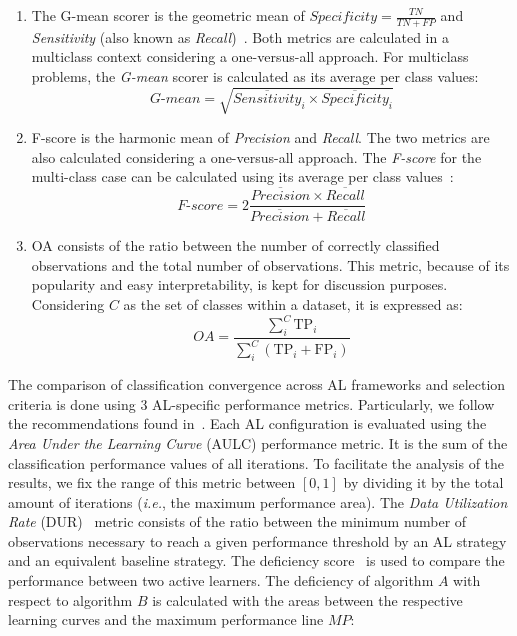 \documentclass[parskip=full]{scrartcl}
\begin{document}
\begin{enumerate}
    \item The G-mean scorer is the geometric mean of $Specificity =
        \frac{TN}{TN + FP}$ and \textit{Sensitivity} (also known as
        \textit{Recall})~\cite{Kubat1997}. Both metrics are calculated in a
        multiclass context considering a one-versus-all approach. For
        multiclass problems, the \textit{G-mean} scorer is calculated as its
        average per class values: 
        \begin{equation}\label{eq:gmean}
            \textit{G-mean} = \sqrt{\overline{Sensitivity}_i \times
            \overline{Specificity}_i}
        \end{equation}
    
    \item F-score is the harmonic mean of \textit{Precision} and
        \textit{Recall}. The two metrics are also calculated considering a
        one-versus-all approach. The \textit{F-score} for the multi-class case
        can be calculated using its average per class values~\cite{He2009}:
        \begin{equation}\label{eq:fscore}
            \textit{F-score}=2\frac{\overline{Precision} \times
            \overline{Recall}}{\overline{Precision} + \overline{Recall}}
        \end{equation}

    \item OA consists of the ratio between the number of correctly classified
        observations and the total number of observations. This metric, because
        of its popularity and easy interpretability, is kept for discussion
        purposes.  Considering $C$ as the set of classes within a dataset, it
        is expressed as: \begin{equation}\label{eq:oa} \textit{OA} =
        \frac{\sum_{i}^{C}{\text{TP}_{i}}}{\sum_{i}^{C}{(\text{TP}_{i} +
    \text{FP}_{i})}} \end{equation}

\end{enumerate}

The comparison of classification convergence across AL frameworks and
selection criteria is done using 3 AL-specific performance metrics.
Particularly, we follow the recommendations found in~\cite{Kottke2017}. Each
AL configuration is evaluated using the \textit{Area Under the Learning Curve}
(AULC) performance metric. It is the sum of the classification performance
values of all iterations. To facilitate the analysis of the results, we fix
the range of this metric between $[0,1]$ by dividing it by the total amount of
iterations (\textit{i.e.}, the maximum performance area). The \textit{Data
Utilization Rate} (DUR)~\cite{Reitmaier2013} metric consists of the ratio
between the minimum number of observations necessary to reach a given
performance threshold by an AL strategy and an equivalent baseline strategy.
The deficiency score~\cite{Yanik2015} is used to compare the performance
between two active learners. The deficiency of algorithm $A$ with respect to
algorithm $B$ is calculated with the areas between the respective learning
curves and the maximum performance line $MP$:
\end{document}
